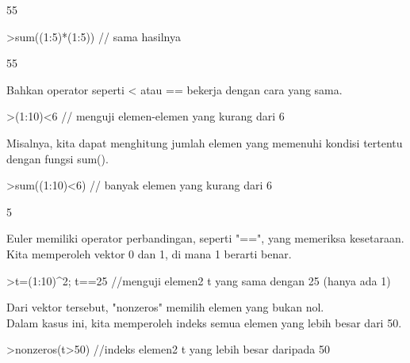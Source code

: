 \documentclass[a4paper,10pt]{article}
\begin{document}
\begin{eulernotebook}
\begin{eulercomment}
\begin{eulercomment}
\begin{eulercomment}
\begin{eulercomment}
\begin{eulercomment}
\begin{eulercomment}
\begin{euleroutput}
  55
\end{euleroutput}
\begin{eulerprompt}
>sum((1:5)*(1:5)) // sama hasilnya
\end{eulerprompt}
\begin{euleroutput}
  55
\end{euleroutput}
\begin{eulercomment}
Bahkan operator seperti \textless{} atau == bekerja dengan cara yang sama.
\end{eulercomment}
\begin{eulerprompt}
>(1:10)<6 // menguji elemen-elemen yang kurang dari 6
\end{eulerprompt}
\begin{euleroutput}
  [1,  1,  1,  1,  1,  0,  0,  0,  0,  0]
\end{euleroutput}
\begin{eulercomment}
Misalnya, kita dapat menghitung jumlah elemen yang memenuhi kondisi
tertentu dengan fungsi sum().
\end{eulercomment}
\begin{eulerprompt}
>sum((1:10)<6) // banyak elemen yang kurang dari 6
\end{eulerprompt}
\begin{euleroutput}
  5
\end{euleroutput}
\begin{eulercomment}
Euler memiliki operator perbandingan, seperti "==", yang memeriksa
kesetaraan.\\
Kita memperoleh vektor 0 dan 1, di mana 1 berarti benar.
\end{eulercomment}
\begin{eulerprompt}
>t=(1:10)^2; t==25 //menguji elemen2 t yang sama dengan 25 (hanya ada 1)
\end{eulerprompt}
\begin{euleroutput}
  [0,  0,  0,  0,  1,  0,  0,  0,  0,  0]
\end{euleroutput}
\begin{eulercomment}
Dari vektor tersebut, "nonzeros" memilih elemen yang bukan nol.\\
Dalam kasus ini, kita memperoleh indeks semua elemen yang lebih besar
dari 50.
\end{eulercomment}
\begin{eulerprompt}
>nonzeros(t>50) //indeks elemen2 t yang lebih besar daripada 50
\end{eulerprompt}
\begin{euleroutput}
  [8,  9,  10]
\end{euleroutput}

\end{eulercomment}
\end{eulercomment}
\end{eulercomment}
\end{eulercomment}
\end{eulercomment}
\end{eulercomment}
\end{eulernotebook}
\end{document}
